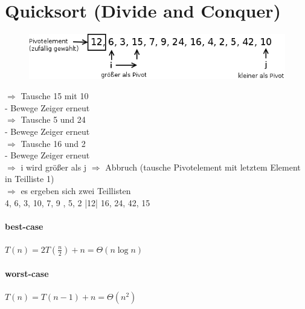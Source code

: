 \section{Quicksort (Divide and Conquer)}

\begin{figure}[h]
\includegraphics[width=0.6\linewidth]{05/Grafik/img1.png}
\end{figure}

$\Rightarrow $ Tausche 15 mit 10 \\
- Bewege Zeiger erneut \\
$\Rightarrow $ Tausche 5 und 24 \\
- Bewege Zeiger erneut \\
$\Rightarrow $ Tausche 16 und 2 \\
- Bewege Zeiger erneut \\
$\Rightarrow $ i wird größer als j $\Rightarrow $  Abbruch (tausche Pivotelement mit letztem Element in Teilliste 1) \\
$\Rightarrow $ es ergeben sich zwei Teillisten \\

4, 6, 3, 10, 7, 9 , 5, 2 |12| 16, 24, 42, 15
\paragraph{best-case}  $T(n) = 2 T \left(\frac{n}{2} \right) + n = \Theta(n \log n) $
\paragraph{worst-case}  $T(n) = T(n-1) + n = \Theta(n^2) $
